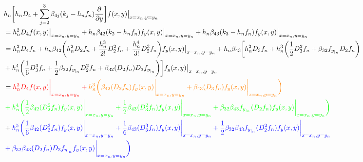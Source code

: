 \documentclass[12 pt]{article}
\begin{document}
\begin{align*}
	&h_{n}\bigg[h_{n}D_{4} + \sum_{j=2}^{3}\beta_{4j}(k_{j} - h_{n}f_{n})\frac{\partial}{\partial y}\bigg]f(x,y)\big\vert_{x = x_{n}, y= y_{n}}\\
	&= h_{n}^{2}D_{4}f(x,y)\big\vert_{x = x_{n}, y= y_{n}} + h_{n}\beta_{42}(k_{2}-h_{n}f_{n})f_{y}(x,y)\big\vert_{x = x_{n}, y= y_{n}} + h_{n}\beta_{43}(k_{3}-h_{n}f_{n})f_{y}(x,y)\big\vert_{x = x_{n}, y= y_{n}}\\
	&= h_{n}^{2}D_{4}f_{n} + h_{n}\beta_{42}\bigg(h_{n}^{2}D_{2}f_{n} + \frac{h_{n}^{3}}{2!}D_{2}^{2}f_{n} + \frac{h_{n}^{4}}{3!}D_{2}^{3}f_{n}\bigg)f_{y}(x,y)\big\vert_{x = x_{n}, y= y_{n}} + h_{n}\beta_{43}\bigg[h_{n}^{2}D_{3}f_{n} + h_{n}^{3}\bigg(\frac{1}{2}D_{3}^{2}f_{n} + \beta_{32}f_{y_{|_{n}}}D_{2}f_{n}\bigg) \\
	&+ h_{n}^{4}\bigg(\frac{1}{6}D_{3}^{3}f_{n} + \frac{1}{2}\beta_{32}f_{y_{|_{n}}}D_{2}^{2}f_{n} + \beta_{32}(D_{2}f_{n})D_{3}f_{y_{|_{n}}}\bigg)\bigg]f_{y}(x,y)\big\vert_{x = x_{n}, y= y_{n}}\\
	&= \color{red}h_{n}^{2}D_{4}f(x,y)\bigg\vert_{x=x_{n}, y= y_{n}} + \color{orange}h_{n}^{3}\bigg(\beta_{42}(D_{2}f_{n})f_{y}(x,y)\bigg\vert_{x=x_{n}, y= y_{n}} + \beta_{43}(D_{3}f_{n})f_{y}(x,y)\bigg\vert_{x=x_{n}, y= y_{n}}\bigg) \\
	&\color{green}+ h_{n}^{4}\bigg(\frac{1}{2}\beta_{42}(D_{2}^{2}f_{n})f_{y}(x,y)\bigg\vert_{x=x_{n}, y= y_{n}} + \frac{1}{2}\beta_{43}(D_{3}^{2}f_{n})f_{y}(x,y)\bigg\vert_{x=x_{n}, y= y_{n}} + \beta_{32}\beta_{43}f_{y_{|_{n}}}(D_{2}f_{n})f_{y}(x,y)\bigg\vert_{x=x_{n}, y= y_{n}}\bigg)\\
	&+\color{blue}h_{n}^{5}\bigg(\frac{1}{6}\beta_{42}(D_{2}^{3}f_{n})f_{y}(x,y)\bigg\vert_{x=x_{n}, y= y_{n}} +\frac{1}{6}\beta_{43}(D_{3}^{3}f_{n})f_{y}(x,y)\bigg\vert_{x=x_{n}, y= y_{n}} + \frac{1}{2}\beta_{32}\beta_{43}f_{y_{|_{n}}}(D_{2}^{2}f_{n})f_{y}(x,y)\bigg\vert_{x=x_{n}, y= y_{n}} \\
	&\color{blue}+ \beta_{32}\beta_{43}(D_{2}f_{n})D_{3}f_{y_{|_{n}}}f_{y}(x,y)\bigg\vert_{x=x_{n}, y= y_{n}}\bigg)
\end{align*}
\end{document}
